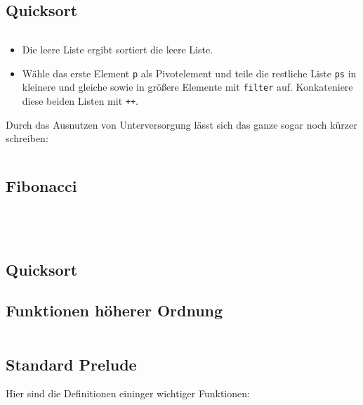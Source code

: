 \subsection{Quicksort}
\inputminted[linenos, numbersep=5pt, tabsize=4, frame=lines, label=qsort.hs]{haskell}{scripts/haskell/qsort.hs}

\begin{itemize}
    \item Die leere Liste ergibt sortiert die leere Liste.
    \item Wähle das erste Element \texttt{p} als Pivotelement und
          teile die restliche Liste \texttt{ps} in kleinere und 
          gleiche sowie in größere Elemente mit \texttt{filter} auf.
          Konkateniere diese beiden Listen mit \texttt{++}.
\end{itemize}

Durch das Ausnutzen von Unterversorgung lässt
sich das ganze sogar noch kürzer schreiben:

\inputminted[linenos, numbersep=5pt, tabsize=4, frame=lines, label=qsort.hs]{haskell}{scripts/haskell/qsort-unterversorg.hs}

\subsection{Fibonacci}
\inputminted[linenos, numbersep=5pt, tabsize=4, frame=lines, label=fibonacci.hs]{haskell}{scripts/haskell/fibonacci.hs}
\inputminted[linenos, numbersep=5pt, tabsize=4, frame=lines, label=fibonacci-akk.hs]{haskell}{scripts/haskell/fibonacci-akk.hs}
\inputminted[linenos, numbersep=5pt, tabsize=4, frame=lines, label=fibonacci-zip.hs]{haskell}{scripts/haskell/fibonacci-zip.hs}
\inputminted[linenos, numbersep=5pt, tabsize=4, frame=lines, label=fibonacci-pattern-matching.hs]{haskell}{scripts/haskell/fibonacci-pattern-matching.hs}

\subsection{Quicksort}
\subsection{Funktionen höherer Ordnung}\label{bsp:foldl-und-foldr}
\inputminted[linenos, numbersep=5pt, tabsize=4, frame=lines, label=folds.hs]{haskell}{scripts/haskell/folds.hs}


\subsection{Standard Prelude}
Hier sind die Definitionen eininger wichtiger Funktionen:

